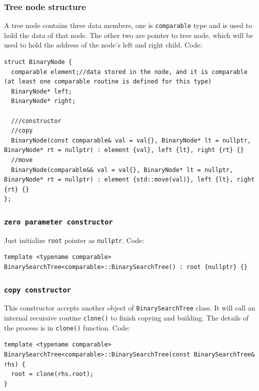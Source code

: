 \documentclass[11pt]{book}
\begin{document}
\subsubsection{Tree node structure}
\label{sec:org808d683}
A tree node contains three data members, one is \texttt{comparable} type and is used to hold the data of that node. The other two are pointer to tree node, which will be used to hold the address of the node's left and right child. Code:
\begin{verbatim}
struct BinaryNode {
  comparable element;//data stored in the node, and it is comparable (at least one comparable routine is defined for this type)
  BinaryNode* left;
  BinaryNode* right;

  ///constructor
  //copy
  BinaryNode(const comparable& val = val{}, BinaryNode* lt = nullptr, BinaryNode* rt = nullptr) : element {val}, left {lt}, right {rt} {}
  //move
  BinaryNode(comparable&& val = val{}, BinaryNode* lt = nullptr, BinaryNode* rt = nullptr) : element {std::move(val)}, left {lt}, right {rt} {}
};
\end{verbatim}

\subsubsection{\texttt{zero parameter constructor}}
\label{sec:org6b8b31e}
Just initialize \texttt{root} pointer as \texttt{nullptr}. Code:
\begin{verbatim}
template <typename comparable>
BinarySearchTree<comparable>::BinarySearchTree() : root {nullptr} {}
\end{verbatim}

\subsubsection{\texttt{copy constructor}}
\label{sec:org80fc9bc}
This constructor accepts another object of \texttt{BinarySearchTree} class. It will call an internal recursive routine \texttt{clone()} to finish copying and building. The details of the process is in \texttt{clone()} function. Code:
\begin{verbatim}
template <typename comparable>
BinarySearchTree<comparable>::BinarySearchTree(const BinarySearchTree& rhs) {
  root = clone(rhs.root);
}
\end{verbatim}
\end{document}

